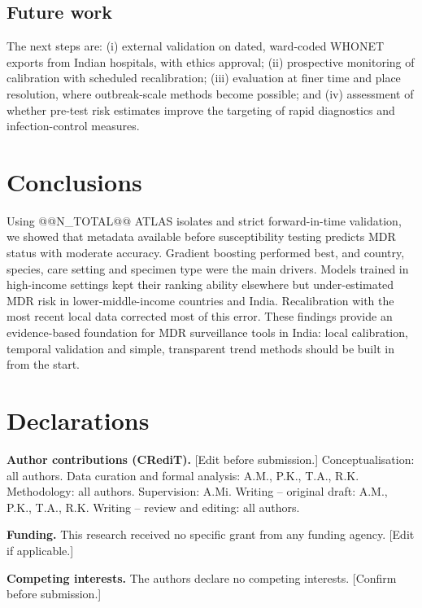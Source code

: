 \documentclass[11pt,a4paper]{article}
\begin{document}
\subsection{Future work}
The next steps are: (i) external validation on dated, ward-coded WHONET exports from Indian hospitals, with ethics approval; (ii) prospective monitoring of calibration with scheduled recalibration; (iii) evaluation at finer time and place resolution, where outbreak-scale methods become possible; and (iv) assessment of whether pre-test risk estimates improve the targeting of rapid diagnostics and infection-control measures.

\section{Conclusions}\label{sec:conclusion}
Using @@N_TOTAL@@ ATLAS isolates and strict forward-in-time validation, we showed that metadata available before susceptibility testing predicts MDR status with moderate accuracy. Gradient boosting performed best, and country, species, care setting and specimen type were the main drivers. Models trained in high-income settings kept their ranking ability elsewhere but under-estimated MDR risk in lower-middle-income countries and India. Recalibration with the most recent local data corrected most of this error. These findings provide an evidence-based foundation for MDR surveillance tools in India: local calibration, temporal validation and simple, transparent trend methods should be built in from the start.

\section*{Declarations}
\textbf{Author contributions (CRediT).} [Edit before submission.] Conceptualisation: all authors. Data curation and formal analysis: A.M., P.K., T.A., R.K. Methodology: all authors. Supervision: A.Mi. Writing -- original draft: A.M., P.K., T.A., R.K. Writing -- review and editing: all authors.

\noindent\textbf{Funding.} This research received no specific grant from any funding agency. [Edit if applicable.]

\noindent\textbf{Competing interests.} The authors declare no competing interests. [Confirm before submission.]
\end{document}
